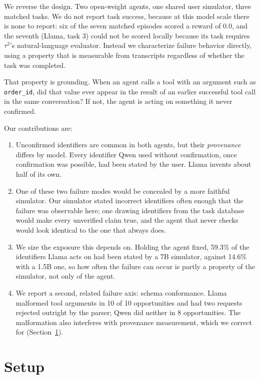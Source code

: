 \documentclass{article}
\begin{document}
We reverse the design. Two open-weight agents, one shared user simulator, three matched tasks. We do not report task success, because at this model scale there is none to report: six of the seven matched episodes scored a reward of $0.0$, and the seventh (Llama, task 3) could not be scored locally because its task requires $\tau^2$'s natural-language evaluator. Instead we characterize failure behavior directly, using a property that is measurable from transcripts regardless of whether the task was completed.

That property is grounding. When an agent calls a tool with an argument such as \texttt{order\_id}, did that value ever appear in the result of an earlier successful tool call in the same conversation? If not, the agent is acting on something it never confirmed.

Our contributions are:

\begin{enumerate}
\item Unconfirmed identifiers are common in both agents, but their \emph{provenance} differs by model. Every identifier Qwen used without confirmation, once confirmation was possible, had been stated by the user. Llama invents about half of its own.
\item One of these two failure modes would be concealed by a more faithful simulator. Our simulator stated incorrect identifiers often enough that the failure was observable here; one drawing identifiers from the task database would make every unverified claim true, and the agent that never checks would look identical to the one that always does.
\item We size the exposure this depends on. Holding the agent fixed, 59.3\% of the identifiers Llama acts on had been stated by a 7B simulator, against 14.6\% with a 1.5B one, so how often the failure can occur is partly a property of the simulator, not only of the agent.
\item We report a second, related failure axis: schema conformance. Llama malformed tool arguments in 10 of 10 opportunities and had two requests rejected outright by the parser; Qwen did neither in 8 opportunities. The malformation also interferes with provenance measurement, which we correct for (Section~\ref{sec:setup}).
\end{enumerate}

\section{Setup}
\label{sec:setup}
\end{document}
